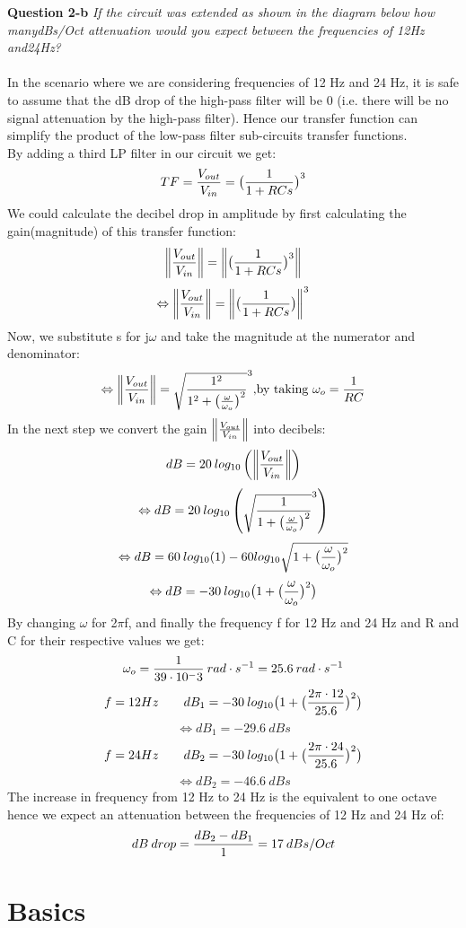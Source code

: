 \documentclass[12pt,twoside]{article}
\begin{document}
\textbf{Question 2-b} \textit{If the circuit was extended as shown in the diagram below how manydBs/Oct attenuation would you expect between the frequencies of 12Hz and24Hz?}
\\\\
In the scenario where we are considering frequencies of 12 Hz and 24 Hz, it is safe to assume that the dB drop of the high-pass filter will be 0 (i.e. there will be no signal attenuation by the high-pass filter). Hence our transfer function can simplify the product of the low-pass filter sub-circuits transfer functions.\\
By adding a third LP filter in our circuit we get:
$$TF = {V_{out}\over V_{in}} = {\big({1 \over {1+RCs}}\big)^3}$$
We could calculate the decibel drop in amplitude by first calculating the gain(magnitude) of this transfer function:
$$ \left\Vert{V_{out}\over V_{in}}\right\Vert = \left\Vert{\big({1 \over {1+RCs}}\big)^3}\right\Vert$$
$$\Leftrightarrow \left\Vert{V_{out}\over V_{in}}\right\Vert = \left\Vert{\big({1 \over {1+RCs}}\big)}\right\Vert^3$$
Now, we substitute s for j$\omega$ and take the magnitude at the numerator and denominator:
$$\Leftrightarrow \left\Vert{V_{out}\over V_{in}}\right\Vert = \sqrt{1^2 \over {1^2+{\big({\omega\over\omega_o}\big)}^2}}^3 \text{,by taking $\omega_o = {1\over RC}$}$$
In the next step we convert the gain $\left\Vert{V_{out}\over V_{in}}\right\Vert$ into decibels:
$$ dB = 20\:log_{10}\left(\left\Vert{V_{out}\over V_{in}}\right\Vert\right)$$
$$\Leftrightarrow dB = 20\:log_{10}\left(\sqrt{1 \over {1+{\big({\omega\over\omega_o}\big)}^2}}^3\right)$$
$$\Leftrightarrow dB = 60\:log_{10}(1)-60log_{10}\sqrt{1+\big({\omega\over\omega_o}\big)^2}$$
$$\Leftrightarrow dB = -30\:log_{10}\big(1+\big({\omega\over\omega_o}\big)^2\big)$$
By changing $\omega$ for 2$\pi$f, and finally the frequency f for 12 Hz and 24 Hz and R and C for their respective values we get:
$$\omega_o = {1\over{39\cdot10^-3}} \:rad\cdot s^{-1} = 25.6\:rad\cdot s^{-1} $$
$$ f = 12 Hz \qquad  dB_{1} =  -30\:log_{10}\big(1+\big({2\pi\cdot 12\over25.6}\big)^2\big)$$
$$\Leftrightarrow dB_{1} = -29.6\: dBs$$
$$ f = 24 Hz \qquad dB_{2} =  -30\:log_{10}\big(1+\big({2\pi\cdot 24\over25.6}\big)^2\big)$$
$$\Leftrightarrow dB_{2} = -46.6 \:dBs$$
The increase in frequency from 12 Hz to 24 Hz is the equivalent to one octave hence
we expect an attenuation between the frequencies of 12 Hz and 24 Hz of:
$$ dB\:drop = {{dB_{2}-dB_{1}} \over {1}}= 17\: dBs/Oct $$
\newpage

\section{Basics}
\end{document}
